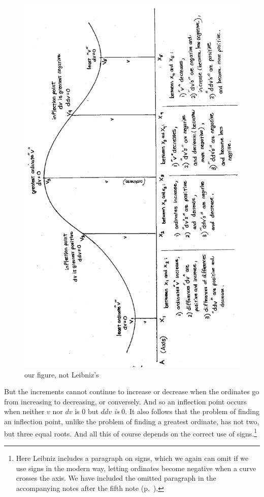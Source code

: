 \documentclass[twoside,openright]{article}
\begin{document}
\begin{figure}[p]
  \begin{center}
    \includegraphics[width=.89\textwidth]{fig/Figure9}
    \caption{our figure, not Leibniz's}
    \label{inflection}
  \end{center}
\end{figure} But the increments cannot continue to increase or
decrease when the ordinates go from increasing to decreasing, or
conversely.  And so an inflection point occurs when neither $v$ nor
$dv$ is 0 but $ddv$ {\em is} 0.  It also follows that the problem of
finding an inflection point, unlike the problem of finding a greatest
ordinate, has not two, but three equal roots. And all this of course depends on the correct use
of signs.\footnote{Here Leibniz includes a paragraph on signs, which
  we again can omit if we use signs in the modern way, letting
  ordinates become negative when a curve crosses the axis.  We have
  included the omitted paragraph in the accompanying notes after the
  fifth note (p.~\pageref{ompar}).}\label{ambsigns}
\end{document}
